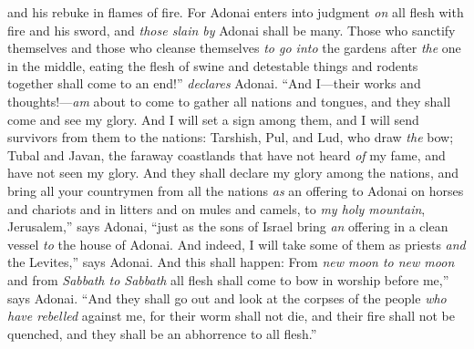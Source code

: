 \begin{biblechapter}
and his rebuke in flames of fire.
\verse For Adonai enters into judgment \textit{on} all flesh with fire and his sword, 
and \textit{those slain by} Adonai shall be many.
\verse Those who sanctify themselves 
and those who cleanse themselves \textit{to go into} the gardens after \textit{the} one in the middle, 
eating the flesh of swine 
and detestable things and rodents together shall come to an end!” \textit{declares} Adonai.
\verse “And I—their works and thoughts!—\textit{am} about to come to gather all nations and tongues, 
and they shall come and see my glory.
\verse And I will set a sign among them, 
and I will send survivors from them to the nations: 
Tarshish, Pul, and Lud, who draw \textit{the} bow; 
Tubal and Javan, the faraway coastlands 
that have not heard \textit{of} my fame, 
and have not seen my glory.
\verse And they shall declare my glory among the nations,
\verse and bring all your countrymen from all the nations \textit{as} an offering to Adonai on horses and chariots and in litters and on mules and camels, to \textit{my holy mountain}, Jerusalem,” says Adonai, “just as the sons of Israel bring \textit{an} offering in a clean vessel \textit{to} the house of Adonai.
\verse And indeed, I will take some of them as priests \textit{and} the Levites,” says Adonai.
\verse And this shall happen: From \textit{new moon to new moon} and from \textit{Sabbath to Sabbath} all flesh shall come to bow in worship before me,” says Adonai.
\verse “And they shall go out and look at the corpses of the people \textit{who have rebelled} against me, for their worm shall not die, 
and their fire shall not be quenched, 
and they shall be an abhorrence to all flesh.”
\end{biblechapter}

